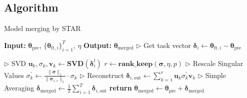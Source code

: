 \newpage
\subsection{Algorithm}

\begin{algorithm}[h]
\caption{Model merging by STAR}\label{alg:STAR}
\begin{algorithmic}
\State \textbf{Input:} \(\bm{\theta}_{\text{pre}}\), \(\{\bm{\theta}_{\text{ft}, i}\}_{i=1}^{T}\), \(\eta\) 
\State \textbf{Output:} \(\bm{\theta}_{\text{merged}}\)
    \State $\triangleright$ Get task vector
    \State $\bm{\delta}_{i} \gets \bm{\theta}_{\text{ft}, i} - \bm{\theta}_{\text{pre}}$
    
        \State $\triangleright$ SVD
        \State $\bm{u}_{k}, \sigma_{k}, \bm{v}_{k} \gets \textbf{SVD}(\bm{\delta}_{i}^{l})$
        \State $r \gets \textbf{rank\_keep}(\bm{\sigma}, \eta, p)$\label{derived_r}
        \State  $\triangleright$ Rescale Singular Values
        \State $\sigma_k^{'} \gets \frac{\|\bm{\sigma}\|_{1}}{\|\bm{\sigma}_{1:r}\|_{1}} \cdot \sigma_k$
        \EndFor
        \State  $\triangleright$ Reconstruct
        \State $\bm{\delta}_{i, \text{out}} \gets \sum_{k=1}^{r} \bm{u}_{k} \sigma_{k}^{'} \bm{v}_{k}$
    \EndFor
\EndFor
\State  $\triangleright$  Simple Averaging
\State $\bm{\delta}_{\text{merged}} \gets \frac{1}{T} \sum_{i=1}^{T} \bm{\delta}_{i, \text{out}}$
\State \textbf{return} $\bm{\theta}_{\text{merged}} \gets \bm{\theta}_{\text{pre}} + \bm{\delta}_{\text{merged}}$
\end{algorithmic}
\end{algorithm}







